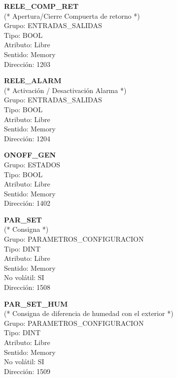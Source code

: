\vspace{10mm}

\textbf{RELE\_COMP\_RET}\\(* Apertura/Cierre Compuerta de retorno *)\\Grupo: ENTRADAS\_SALIDAS\\Tipo: BOOL\\Atributo: Libre\\Sentido: Memory\\Dirección: 1203

\vspace{10mm}

\textbf{RELE\_ALARM}\\(* Activación / Desactivación Alarma *)\\Grupo: ENTRADAS\_SALIDAS\\Tipo: BOOL\\Atributo: Libre\\Sentido: Memory\\Dirección: 1204

\vspace{10mm}

\textbf{ONOFF\_GEN}\\Grupo: ESTADOS\\Tipo: BOOL\\Atributo: Libre\\Sentido: Memory\\Dirección: 1402

\vspace{10mm}

\textbf{PAR\_SET}\\(* Consigna *)\\Grupo: PARAMETROS\_CONFIGURACION\\Tipo: DINT\\Atributo: Libre\\Sentido: Memory\\No volátil: SI\\Dirección: 1508

\vspace{10mm}

\textbf{PAR\_SET\_HUM}\\(* Consigna de diferencia de humedad con el exterior *)\\Grupo: PARAMETROS\_CONFIGURACION\\Tipo: DINT\\Atributo: Libre\\Sentido: Memory\\No volátil: SI\\Dirección: 1509


